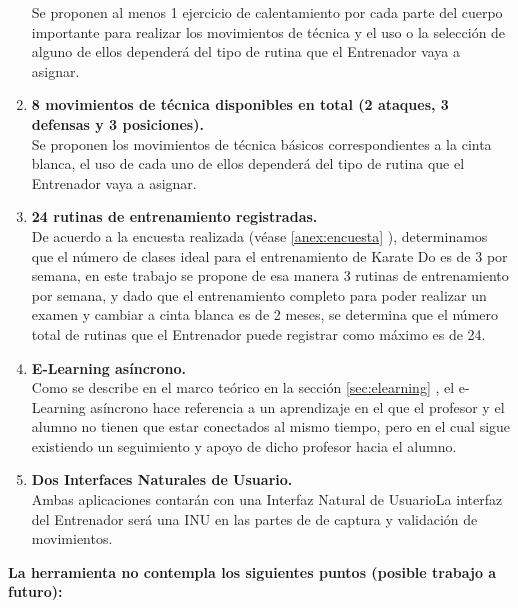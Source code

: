 \begin{enumerate}
	Se proponen al menos 1 ejercicio de calentamiento por cada parte del cuerpo importante para realizar los movimientos de técnica y el uso o la selección de alguno de ellos dependerá del tipo de rutina que el Entrenador vaya a asignar.\\
	\item \textbf{\textcolor[rgb]{0, 0, 0.545098}{8 movimientos de técnica disponibles en total (2 ataques, 3 defensas y 3 posiciones).}}\\
	Se proponen los movimientos de técnica básicos correspondientes a la cinta blanca, el uso de cada uno de ellos dependerá del tipo de rutina que el Entrenador vaya a asignar.\\
	\item \textbf{\textcolor[rgb]{0, 0, 0.545098}{24 rutinas de entrenamiento registradas.}}\\
	De acuerdo a la encuesta realizada (véase \ref{anex:encuesta} ), determinamos que el número de clases ideal para el entrenamiento de Karate Do es de 3 por semana, en este trabajo se propone de esa manera 3 rutinas de entrenamiento por semana, y dado que el entrenamiento completo para poder realizar un examen y cambiar a cinta blanca es de 2 meses, se determina que el número total de rutinas que el Entrenador puede registrar como máximo es de 24.\\
	\item \textbf{\textcolor[rgb]{0, 0, 0.545098}{E-Learning asíncrono.}}\\
	Como se describe en el marco teórico en la sección \ref{sec:elearning} , el e-Learning asíncrono hace referencia a un aprendizaje en el que el profesor y el alumno no tienen que estar conectados al mismo tiempo, pero en el cual sigue existiendo un seguimiento y apoyo de dicho profesor hacia el alumno.\\
	\item \textbf{\textcolor[rgb]{0, 0, 0.545098}{Dos Interfaces Naturales de Usuario.}}\\
	Ambas aplicaciones contarán con una Interfaz Natural de UsuarioLa interfaz del Entrenador será una INU en las partes de de captura y validación de movimientos.\\
	

\end{enumerate}
\vspace{1em}
\textbf{La herramienta no contempla los siguientes puntos (posible trabajo a futuro):}\\

